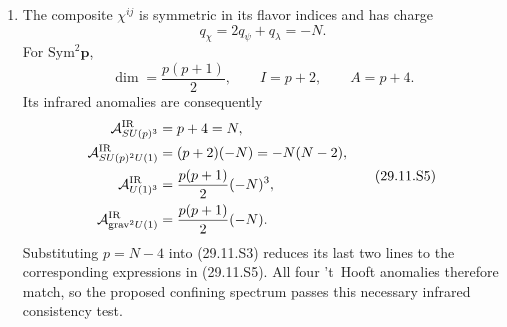 \begin{enumerate}
\begin{enumerate}
    \item[(iv)]
    The composite \(\chi^{ij}\) is symmetric in its flavor indices and
    has charge
    \[
      q_\chi=2q_\psi+q_\lambda=-N.
      \tag{29.11.S4}
    \]
    For \(\mathrm{Sym}^2\boldsymbol p\),
    \[
      \dim=\frac{p(p+1)}2,\qquad I=p+2,\qquad A=p+4.
    \]
    Its infrared anomalies are consequently
    \[
    \begin{aligned}
      \mathcal A_{SU(p)^3}^{\rm IR}
        &=p+4=N,\\
      \mathcal A_{SU(p)^2U(1)}^{\rm IR}
        &=(p+2)(-N)=-N(N-2),\\
      \mathcal A_{U(1)^3}^{\rm IR}
        &=\frac{p(p+1)}2(-N)^3,\\
      \mathcal A_{\mathrm{grav}^2U(1)}^{\rm IR}
        &=\frac{p(p+1)}2(-N).
    \end{aligned}
    \tag{29.11.S5}
    \]
    Substituting \(p=N-4\) into (29.11.S3) reduces its last two lines to
    the corresponding expressions in (29.11.S5).  All four 't~Hooft
    anomalies therefore match, so the proposed confining spectrum passes
    this necessary infrared consistency test.
  \end{enumerate}


\end{enumerate}
